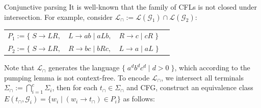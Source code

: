 \documentclass{beamer}
\begin{document}
    \begin{frame}[fragile]{Conjunctive parsing}
        It is well-known that the family of CFLs is not closed under intersection. For example, consider $\mathcal{L}_\cap := \mathcal{L}(\mathcal{G}_1) \cap \mathcal{L}(\mathcal{G}_2)$:

        \begin{table}[H]
          \begin{tabular}{llll}
            $P_1 := \big\{\;S \rightarrow L R,$ & $L \rightarrow a b \mid a L b,$ & $R \rightarrow c \mid c R\;\big\}$\vspace{5pt}\\
            $P_2 := \big\{\;S \rightarrow L R,$ & $R \rightarrow b c \mid b R c,$ & $L \rightarrow a \mid a L\;\big\}$
          \end{tabular}
        \end{table}

        \noindent Note that $\mathcal{L}_\cap$ generates the language $\big\{\;a^d b^d c^d \mid d > 0\;\big\}$, which according to the pumping lemma is not context-free. To encode $\mathcal{L}_\cap$, we intersect all terminals $\Sigma_\cap := \bigcap_{i=1}^c \Sigma_i$, then for each $t_\cap \in \Sigma_\cap$ and CFG, construct an equivalence class $E(t_\cap, \mathcal{G}_i) = \{ w_i \mid (w_i \rightarrow t_\cap) \in P_i\}$ as follows:\vspace{-5pt}


\end{frame}
\end{document}
